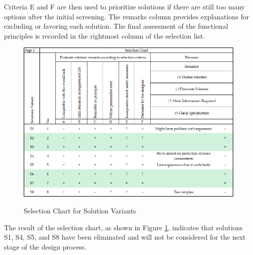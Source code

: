 Criteria E and F are then used to prioritize solutions if there are still too many options after the initial screening. The remarks column provides explanations for excluding or favoring each solution. The final assessment of the functional principles is recorded in the rightmost column of the selection list.

\begin{figure}[ht!]
    \centering
    {\includegraphics[width=\linewidth]{texs/Part1/chapter3/image/selchart2.png}}
    \caption{Selection Chart for Solution Variants}
    \label{fig:selection-chart-solution-variants}
\end{figure}

The result of the selection chart, as shown in Figure \ref{fig:selection-chart-solution-variants}, indicates that solutions S1, S4, S5, and S8 have been eliminated and will not be considered for the next stage of the design process.

